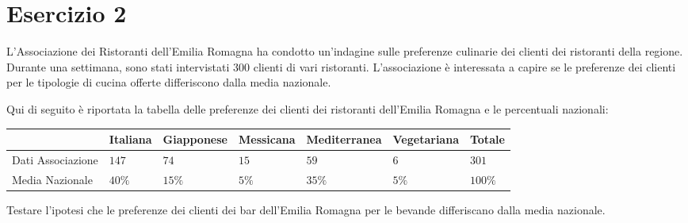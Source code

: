 \documentclass[
  11pt,
]{book}
\theoremstyle{mytheoremstyle}
\theoremstyle{mydefstyle}
\begin{document}
\section{Esercizio 2}\label{esercizio-2-1}

L'Associazione dei Ristoranti dell'Emilia Romagna ha condotto un'indagine sulle preferenze culinarie dei clienti dei ristoranti della regione. Durante una settimana, sono stati intervistati 300 clienti di vari ristoranti. L'associazione è interessata a capire se le preferenze dei clienti per le tipologie di cucina offerte differiscono dalla media nazionale.

Qui di seguito è riportata la tabella delle preferenze dei clienti dei ristoranti dell'Emilia Romagna e le percentuali nazionali:

\begin{table}[H]
\centering
\begin{tabular}{lllllll}
\toprule
  & Italiana & Giapponese & Messicana & Mediterranea & Vegetariana & Totale\\
\midrule
Dati Associazione & $147$ & $74$ & $15$ & $59$ & $6$ & $301$\\
Media Nazionale & $40\%$ & $15\%$ & $5\%$ & $35\%$ & $5\%$ & $100\%$\\
\bottomrule
\end{tabular}
\end{table}

Testare l'ipotesi che le preferenze dei clienti dei bar dell'Emilia Romagna per le bevande differiscano dalla media nazionale.
\end{document}
